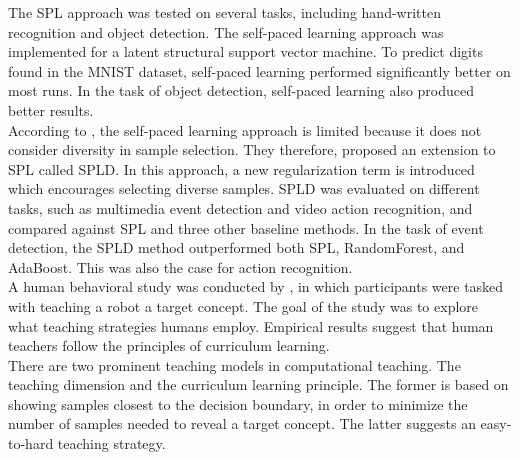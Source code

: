 The \ac{SPL} approach was tested on several tasks, including hand-written recognition and object detection. The self-paced learning approach was implemented for a latent structural support vector machine. To predict digits found in the MNIST dataset, self-paced learning performed significantly better on most runs. In the task of object detection, self-paced learning also produced better results.  \\

According to \cite{Lu_self-paced_learning_diversity}, the self-paced learning approach is limited because it does not consider diversity in sample selection. They therefore, proposed an extension to \ac{SPL} called \ac{SPLD}. In this approach, a new regularization term is introduced which encourages selecting diverse samples. \ac{SPLD} was evaluated on different tasks, such as multimedia event detection and video action recognition, and compared against \ac{SPL} and three other baseline methods. In the task of event detection, the \ac{SPLD} method outperformed both \ac{SPL}, RandomForest, and AdaBoost. This was also the case for action recognition.\\




A human behavioral study was conducted by \citep{Khan_human_teach}, in which participants were tasked with teaching a robot a target concept. The goal of the study was to explore what teaching strategies humans employ. Empirical results suggest that human teachers follow the principles of curriculum learning. \\

There are two prominent teaching models in computational teaching. The teaching dimension and the curriculum  learning principle. The former is based on showing samples closest to the decision boundary, in order to minimize the number of samples needed to reveal a target concept. The latter suggests an easy-to-hard teaching strategy. \\

